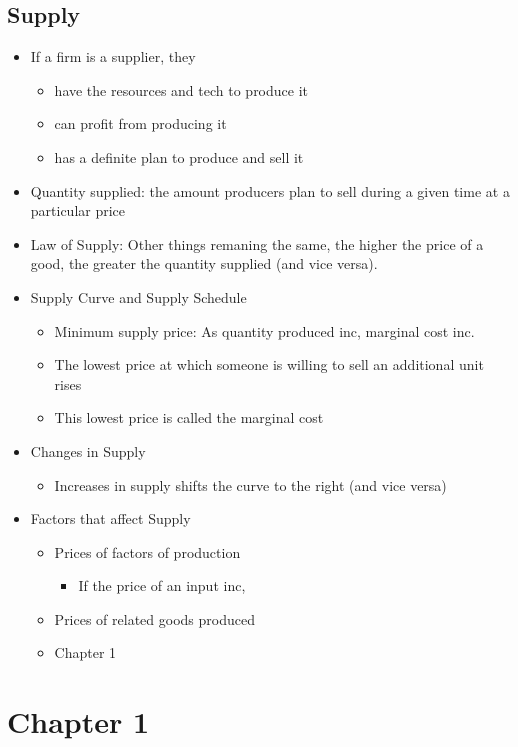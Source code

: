 \documentclass[11pt]{article}
\begin{document}
\subsection{Supply}
\label{sec:org84736fa}
\begin{itemize}
\item If a firm is a supplier, they
\begin{itemize}
\item have the resources and tech to produce it
\item can profit from producing it
\item has a definite plan to produce and sell it
\end{itemize}
\item Quantity supplied: the amount producers plan to sell during a given time at a particular price
\item Law of Supply: Other things remaning the same, the higher the price of a good, the greater the
quantity supplied (and vice versa).
\item Supply Curve and Supply Schedule
\begin{itemize}
\item Minimum supply price: As quantity produced inc, marginal cost inc.
\item The lowest price at which someone is willing to sell an additional unit rises
\item This lowest price is called the marginal cost
\end{itemize}
\item Changes in Supply
\begin{itemize}
\item Increases in supply shifts the curve to the right (and vice versa)
\end{itemize}
\item Factors that affect Supply
\begin{itemize}
\item Prices of factors of production
\begin{itemize}
\item If the price of an input inc,
\end{itemize}
\item Prices of related goods produced
\end{itemize}
\begin{itemize}
\item Chapter 1
\end{itemize}
\end{itemize}
\section{Chapter 1}
\label{sec:orgc8f80e7}
\end{document}
